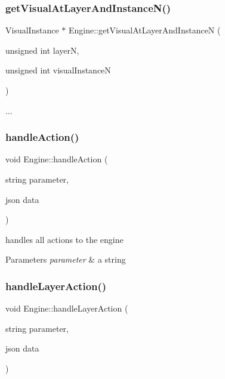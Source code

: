 \subsubsection{\texorpdfstring{get\+Visual\+At\+Layer\+And\+Instance\+N()}{getVisualAtLayerAndInstanceN()}}
{\footnotesize\ttfamily Visual\+Instance $\ast$ Engine\+::get\+Visual\+At\+Layer\+And\+InstanceN (\begin{DoxyParamCaption}\item[{unsigned int}]{layerN,  }\item[{unsigned int}]{visual\+InstanceN }\end{DoxyParamCaption})}

... \mbox{\label{class_engine_ae25acfdee442242b7c1262f02f8b7274}} 
\subsubsection{\texorpdfstring{handle\+Action()}{handleAction()}}
{\footnotesize\ttfamily void Engine\+::handle\+Action (\begin{DoxyParamCaption}\item[{string}]{parameter,  }\item[{json}]{data }\end{DoxyParamCaption})}

handles all actions to the engine 
\begin{DoxyParams}{Parameters}
{\em parameter} & a string \\
\hline
\end{DoxyParams}
\mbox{\label{class_engine_a5633281e514055b66fde30596305d646}} 
\subsubsection{\texorpdfstring{handle\+Layer\+Action()}{handleLayerAction()}}
{\footnotesize\ttfamily void Engine\+::handle\+Layer\+Action (\begin{DoxyParamCaption}\item[{string}]{parameter,  }\item[{json}]{data }\end{DoxyParamCaption})}

